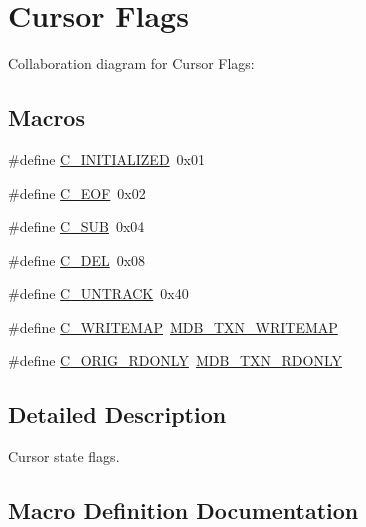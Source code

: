 \hypertarget{group__mdb__cursor}{}\section{Cursor Flags}
\label{group__mdb__cursor}
Collaboration diagram for Cursor Flags\+:
\subsection*{Macros}
\begin{DoxyCompactItemize}
\item 
\#define \mbox{\hyperlink{group__mdb__cursor_ga491771b32c4fdf08d7b66ffb20bbbb32}{C\+\_\+\+I\+N\+I\+T\+I\+A\+L\+I\+Z\+ED}}~0x01
\item 
\#define \mbox{\hyperlink{group__mdb__cursor_gaf3433775e39a8f78e6bdcac026b9354d}{C\+\_\+\+E\+OF}}~0x02
\item 
\#define \mbox{\hyperlink{group__mdb__cursor_ga31bd2871aca0e24b95e6d50b916f7b5b}{C\+\_\+\+S\+UB}}~0x04
\item 
\#define \mbox{\hyperlink{group__mdb__cursor_ga186b8075211f880eab30e33434e511a9}{C\+\_\+\+D\+EL}}~0x08
\item 
\#define \mbox{\hyperlink{group__mdb__cursor_ga79af151f605df221750d7cecbbf498eb}{C\+\_\+\+U\+N\+T\+R\+A\+CK}}~0x40
\item 
\#define \mbox{\hyperlink{group__mdb__cursor_gac4a428761468f9013ada1d11512e5539}{C\+\_\+\+W\+R\+I\+T\+E\+M\+AP}}~\mbox{\hyperlink{group__mdb__txn_ga03da701716875fe8b56118a63a4106ab}{M\+D\+B\+\_\+\+T\+X\+N\+\_\+\+W\+R\+I\+T\+E\+M\+AP}}
\item 
\#define \mbox{\hyperlink{group__mdb__cursor_gad7756b1e12235bcfbe30931f11e78030}{C\+\_\+\+O\+R\+I\+G\+\_\+\+R\+D\+O\+N\+LY}}~\mbox{\hyperlink{group__mdb__txn_ga8b592ca7b3e70786c23510f9f56a0ae2}{M\+D\+B\+\_\+\+T\+X\+N\+\_\+\+R\+D\+O\+N\+LY}}
\end{DoxyCompactItemize}


\subsection{Detailed Description}
Cursor state flags. 

\subsection{Macro Definition Documentation}
\mbox{\label{group__mdb__cursor_ga186b8075211f880eab30e33434e511a9}} 
